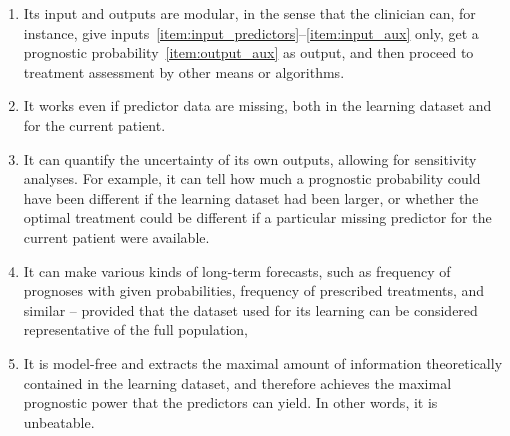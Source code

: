 \documentclass[utf8]{FrontiersinHarvard} %
\renewcommand*{\|}[1][]{\nonscript\:#1\vert\nonscript\:\mathopen{}}
\begin{document}
\begin{enumerate}
\item\label{item:feat_modular_inout} Its input and outputs are modular, in the sense that the clinician can, for instance, give inputs~\ref{item:input_predictors}--\ref{item:input_aux} only, get a prognostic probability~\ref{item:output_aux} as output, and then proceed to treatment assessment by other means or algorithms.

\item\label{item:feat_imputation} It works even if predictor data are missing, both in the learning dataset and for the current patient.

\item\label{item:feat_uncertainty} It can quantify the uncertainty of its own outputs, allowing for sensitivity analyses. For example, it can tell how much a prognostic probability could have been different if the learning dataset had been larger, or whether the optimal treatment could be different if a particular missing predictor for the current patient were available.

\item\label{item:feat_forecast} It can make various kinds of long-term forecasts, such as frequency of prognoses with given probabilities, frequency of prescribed treatments, and similar -- provided that the dataset used for its learning can be considered representative of the full population,

\item\label{item:feat_unbeatable} It is model-free and extracts the maximal amount of information theoretically contained in the learning dataset, and therefore achieves the maximal prognostic power that the predictors can yield. In other words, it is unbeatable.

\end{enumerate}
\end{document}
